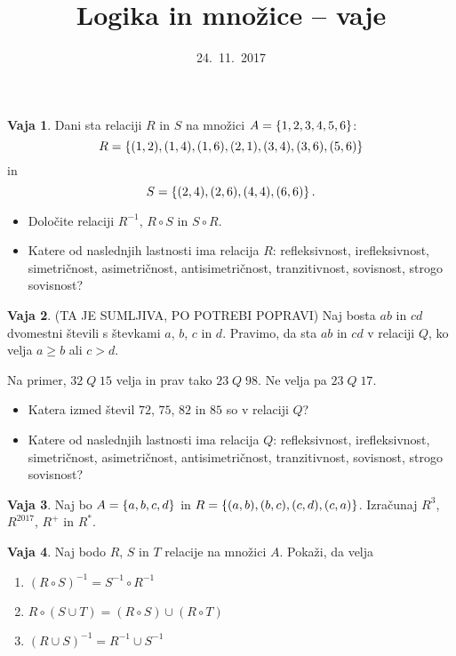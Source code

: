 \documentclass{article}
\theoremstyle{definition}
\newtheorem{vaja}{Vaja}
\begin{document}
\title{Logika in množice -- vaje}
\date{24.~11.~2017}
\maketitle

\begin{vaja}
Dani sta relaciji $R$ in $S$ na množici $A = \set{1,2,3,4,5,6}$:
\[R = \set{(1,2),(1,4),(1,6),(2,1),(3,4),(3,6),(5,6)}\]
in
\[S = \set{(2,4),(2,6),(4,4),(6,6)}.\]
\begin{itemize}
\item Določite relaciji $R^{-1}$, $R \circ S$ in $S \circ R$.
\item Katere od naslednjih lastnosti ima relacija $R$:
refleksivnost, irefleksivnost, simetričnost, asi\-metrič\-nost, anti\-si\-met\-rič\-nost,
tranzitivnost, sovisnost, strogo sovisnost?
\end{itemize}
\end{vaja}


\begin{vaja}
(TA JE SUMLJIVA, PO POTREBI POPRAVI)
Naj bosta $ab$ in $cd$ dvomestni števili s števkami $a$, $b$, $c$ in $d$.
Pravimo, da sta $ab$ in $cd$ v relaciji $Q$, ko velja $a \geq b$ ali $c > d$.

Na primer, $32 \; Q \; 15$ velja in prav tako $23 \; Q \; 98$. Ne velja pa
$23 \; Q \; 17$.


\begin{itemize}
\item Katera izmed števil $72$, $75$, $82$ in $85$ so v relaciji $Q$?
\item Katere od naslednjih lastnosti ima relacija $Q$:
refleksivnost, irefleksivnost, simetričnost, asi\-metrič\-nost, anti\-si\-met\-rič\-nost,
tranzitivnost, sovisnost, strogo sovisnost?
\end{itemize}
\end{vaja}

\begin{vaja}
Naj bo $A = \set{a,b,c,d}$ in $R = \set{(a,b),(b,c),(c,d),(c,a)}$. Izračunaj $R^3$, $R^{2017}$, $R^+$ in $R^*$.
\end{vaja}


\begin{vaja}
Naj bodo $R$, $S$ in $T$ relacije na množici $A$. Pokaži, da velja
\begin{enumerate}
\item $(R \circ S)^{-1} = S^{-1} \circ R^{-1}$
\item $R \circ (S \cup T) = (R \circ S) \cup (R \circ T)$
\item $(R \cup S)^{-1} = R^{-1} \cup S^{-1}$
\end{enumerate}
\end{vaja}
\end{document}
